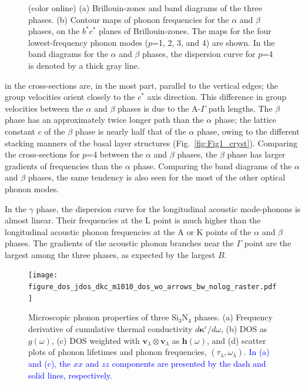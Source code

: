 \documentclass[twocolumn,amsmath,amssymb,a4paper,prb,superscriptaddress,floatfix]{revtex4-1}
\begin{document}
\begin{figure}[H]
\begin{center}
                   \caption{(color online) (a) Brillouin-zones and  band diagrams of the three phases. (b) Contour maps
                           of phonon frequencies for the $\alpha$ and $\beta$ phases, on the  $b^*c^*$  planes of Brillouin-zones.
                           The maps for the four lowest-frequency phonon modes ($p$=1, 2, 3,
                           and 4) are shown. In the band diagrams for the $\alpha$ and
                           $\beta$ phases, the dispersion curve for $p$=4 is denoted by a thick gray line.
                   \label{fig:Fig4_ver5_338} }
    \end{center}
\end{figure}
\noindent
in the cross-sections are, in the
most part, parallel to the vertical edges; the group velocities orient closely
to the $c^*$ axis direction.
This difference in group velocities between the $\alpha$ and $\beta$ phases is due to the A-$\Gamma$
path lengths. The $\beta$ phase has an approximately twice longer path than the
$\alpha$ phase; the lattice constant $c$ of the $\beta$ phase is nearly half
that of the $\alpha$ phase, owing to the different stacking manners of the basal
layer structures (Fig.~\ref{fig:Fig1_cryst}).  Comparing the cross-sections for
$p$=4 between the $\alpha$ and $\beta$ phases, the $\beta$
phase has larger gradients of frequencies than the $\alpha$ phase.  Comparing the
band diagrams of the $\alpha$ and $\beta$ phases, the same tendency is also seen
for the most of the other optical phonon modes.

In the $\gamma$ phase, the dispersion curve for the longitudinal acoustic
mode-phonons is almost linear. Their frequencies at the L point is much higher than the
longitudinal acoustic phonon frequencies at the A or K points of the $\alpha$
and $\beta$ phases.  The gradients of the acoustic phonon branches near the
$\Gamma$ point are the largest among the three phases, as expected by the
largest $B$.

\onecolumngrid


\begin{figure}[h]
         \texttt{[image: figure\_dos\_jdos\_dkc\_m1010\_dos\_wo\_arrows\_bw\_nolog\_raster.pdf]}
  \caption{Microscopic phonon properties of three Si$_3$N$_4$
	  phases. (a) Frequency derivative of cumulative thermal conductivity
	  $d\boldsymbol{\kappa}^c/d\omega$, (b) DOS as $g(\omega)$, (c) DOS
	  weighted with $\mathbf{v}_\lambda\otimes\mathbf{v}_\lambda$ as
	  $\boldsymbol{h}(\omega)$, and (d) scatter plots of phonon lifetimes and
	  phonon frequencies, $(\tau_\lambda,\omega_\lambda)$. \textcolor{blue}{In
	  (a) and (c), the $xx$ and $zz$ components are presented by the
  dash and solid lines, respectively.}
  \label{fig:Fig5_338_rev}}
\end{figure}
\twocolumngrid
\end{document}
